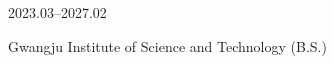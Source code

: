 
\vitae
\begin{education}{2023.03--2027.02}
    \item[2023.03--2027.02] Gwangju Institute of Science and Technology (B.S.)
\end{education}




